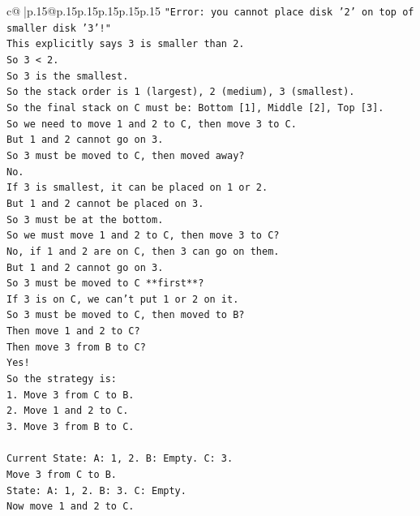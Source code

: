 \documentclass{article}
\begin{document}
{\begin{supertabular}{c@{$\;$}|p{.15\linewidth}@{}p{.15\linewidth}p{.15\linewidth}p{.15\linewidth}p{.15\linewidth}p{.15\linewidth}}
{{{\texttt{"Error: you cannot place disk '2' on top of smaller disk '3'!"} \\
\texttt{This explicitly says 3 is smaller than 2.} \\
\texttt{So 3 < 2.} \\
\texttt{So 3 is the smallest.} \\
\texttt{So the stack order is 1 (largest), 2 (medium), 3 (smallest).} \\
\texttt{So the final stack on C must be: Bottom {[}1{]}, Middle {[}2{]}, Top {[}3{]}.} \\
\texttt{So we need to move 1 and 2 to C, then move 3 to C.} \\
\texttt{But 1 and 2 cannot go on 3.} \\
\texttt{So 3 must be moved to C, then moved away?} \\
\texttt{No.} \\
\texttt{If 3 is smallest, it can be placed on 1 or 2.} \\
\texttt{But 1 and 2 cannot be placed on 3.} \\
\texttt{So 3 must be at the bottom.} \\
\texttt{So we must move 1 and 2 to C, then move 3 to C?} \\
\texttt{No, if 1 and 2 are on C, then 3 can go on them.} \\
\texttt{But 1 and 2 cannot go on 3.} \\
\texttt{So 3 must be moved to C **first**?} \\
\texttt{If 3 is on C, we can't put 1 or 2 on it.} \\
\texttt{So 3 must be moved to C, then moved to B?} \\
\texttt{Then move 1 and 2 to C?} \\
\texttt{Then move 3 from B to C?} \\
\texttt{Yes!} \\
\texttt{So the strategy is:} \\
\texttt{1. Move 3 from C to B.} \\
\texttt{2. Move 1 and 2 to C.} \\
\texttt{3. Move 3 from B to C.} \\
\\ 
\texttt{Current State: A: 1, 2. B: Empty. C: 3.} \\
\texttt{Move 3 from C to B.} \\
\texttt{State: A: 1, 2. B: 3. C: Empty.} \\
\texttt{Now move 1 and 2 to C.} \\
}}}
\end{supertabular}}
\end{document}
